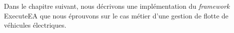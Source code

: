 Dans le chapitre suivant, nous décrivons une implémentation du \emph{framework} ExecuteEA que nous
éprouvons sur le cas métier d'une gestion de flotte de véhicules électriques.

























